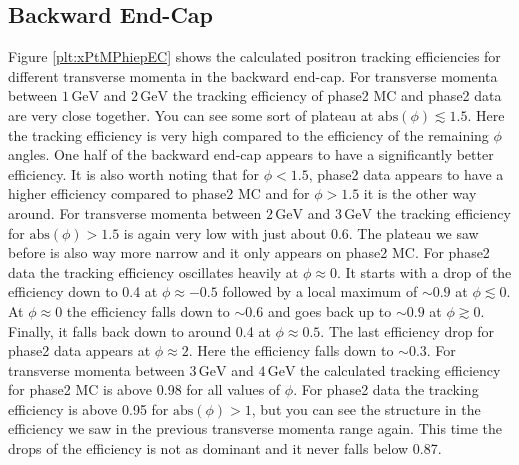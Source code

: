 \documentclass[a4paper,11pt,twosided,final,german,openbib,pdftex,listof=totoc,bibliography=totoc]{scrbook}
\begin{document}
\newpage

\subsection{Backward End-Cap}

Figure \ref{plt:xPtMPhiepEC} shows the calculated positron tracking efficiencies for different transverse momenta in the backward end-cap. 
For transverse momenta between $1\,\textrm{GeV}$ and $2\,\textrm{GeV}$ the tracking efficiency of phase2 MC and phase2 data are very close together. You can see some sort of plateau at $\textrm{abs}(\phi) \lesssim 1.5$. Here the tracking efficiency is very high compared to the efficiency of the remaining $\phi$ angles. One half of the backward end-cap appears to have a significantly better efficiency. It is also worth noting that for $\phi <1.5$, phase2 data appears to have a higher efficiency compared to phase2 MC and for $\phi > 1.5$ it is the other way around. 
For transverse momenta between $2\,\textrm{GeV}$ and $3\,\textrm{GeV}$ the tracking efficiency for $\textrm{abs}(\phi) >1.5$ is again very low with just about 0.6. The plateau we saw before is also way more narrow and it only appears on phase2 MC. For phase2 data the tracking efficiency oscillates heavily at $\phi \approx 0$. It starts with a drop of the efficiency down to 0.4 at $\phi \approx -0.5$ followed by a local maximum of $\sim 0.9$ at $\phi \lesssim 0$. At $\phi \approx 0 $ the efficiency falls down to $\sim 0.6$ and goes back up to $\sim 0.9$ at $\phi \gtrsim 0$. Finally, it falls back down to around 0.4 at $\phi \approx 0.5$. The last efficiency drop for phase2 data appears at $\phi \approx 2$. Here the efficiency falls down to $\sim 0.3$. 
For transverse momenta between $3\,\textrm{GeV}$ and $4\,\textrm{GeV}$ the calculated tracking efficiency for phase2 MC is above 0.98 for all values of $\phi$. For phase2 data the tracking efficiency is above 0.95 for $\textrm{abs}(\phi) > 1$, but you can see the structure in the efficiency we saw in the previous transverse momenta range again. This time the drops of the efficiency is not as dominant and it never falls below 0.87.
\end{document}
